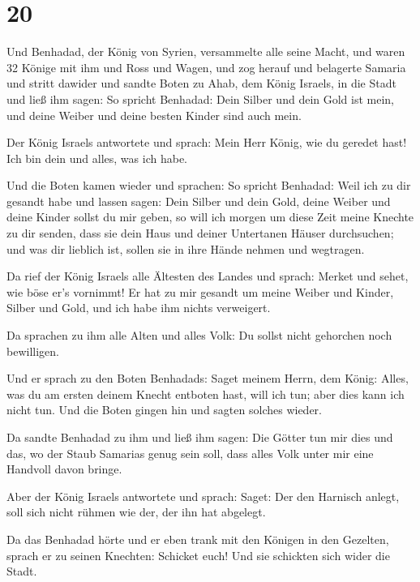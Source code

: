 \hypertarget{section-19}{%
\section{20}\label{section-19}}

 Und Benhadad, der König von Syrien, versammelte alle
seine Macht, und waren 32 Könige mit ihm und Ross und Wagen, und zog
herauf und belagerte Samaria und stritt dawider  und
sandte Boten zu Ahab, dem König Israels, in die Stadt  und
ließ ihm sagen: So spricht Benhadad: Dein Silber und dein Gold ist mein,
und deine Weiber und deine besten Kinder sind auch mein.

 Der König Israels antwortete und sprach: Mein Herr König,
wie du geredet hast! Ich bin dein und alles, was ich habe.

 Und die Boten kamen wieder und sprachen: So spricht
Benhadad: Weil ich zu dir gesandt habe und lassen sagen: Dein Silber und
dein Gold, deine Weiber und deine Kinder sollst du mir geben,
 so will ich morgen um diese Zeit meine Knechte zu dir
senden, dass sie dein Haus und deiner Untertanen Häuser durchsuchen; und
was dir lieblich ist, sollen sie in ihre Hände nehmen und wegtragen.

 Da rief der König Israels alle Ältesten des Landes und
sprach: Merket und sehet, wie böse er's vornimmt! Er hat zu mir gesandt
um meine Weiber und Kinder, Silber und Gold, und ich habe ihm nichts
verweigert.

 Da sprachen zu ihm alle Alten und alles Volk: Du sollst
nicht gehorchen noch bewilligen.

 Und er sprach zu den Boten Benhadads: Saget meinem Herrn,
dem König: Alles, was du am ersten deinem Knecht entboten hast, will ich
tun; aber dies kann ich nicht tun. Und die Boten gingen hin und sagten
solches wieder.

 Da sandte Benhadad zu ihm und ließ ihm sagen: Die Götter
tun mir dies und das, wo der Staub Samarias genug sein soll, dass alles
Volk unter mir eine Handvoll davon bringe.

 Aber der König Israels antwortete und sprach: Saget: Der
den Harnisch anlegt, soll sich nicht rühmen wie der, der ihn hat
abgelegt.

 Da das Benhadad hörte und er eben trank mit den Königen
in den Gezelten, sprach er zu seinen Knechten: Schicket euch! Und sie
schickten sich wider die Stadt.

